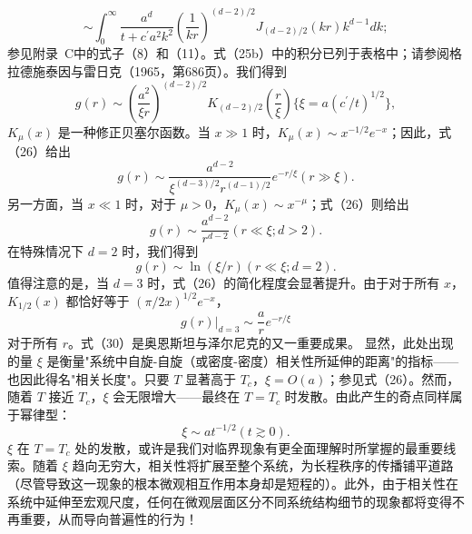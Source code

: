 \begin{equation}\tag{12.11.28}\label{eq:12.11.28}
\sim \int _ { 0 } ^{\infty} \frac { a ^{d} } { t + c ^{\prime} a ^{2} k ^{2} } \left( \frac { 1 } { k r } \right) ^{( d - 2 ) / 2} J _ { ( d - 2 ) / 2 } ( k r ) k ^{d - 1} d k ;
\end{equation}
参见附录~C中的式子（8）和（11）。式（25b）中的积分已列于表格中；请参阅格拉德施泰因与雷日克（1965，第686页）。我们得到
\begin{equation}\tag{12.11.29}\label{eq:12.11.29}
g ( r ) \sim \left( \frac { a ^{2} } { \xi r } \right) ^{( d - 2 ) / 2} K _ { ( d - 2 ) / 2 } \left( \frac { r } { \xi } \right)  \{ \xi = a ( c ^{\prime} / t ) ^{1 / 2} \} ,
\end{equation}
\(K_{\mu}(x)\) 是一种修正贝塞尔函数。当 \(x \gg 1\) 时，\(K_{\mu}(x) \sim x^{-1/2}e^{-x}\)；因此，式（26）给出
\begin{equation}\tag{12.11.30}\label{eq:12.11.30}
g ( r ) \sim \frac { a ^{d - 2} } { \xi ^{( d - 3 ) / 2} r ^{( d - 1 ) / 2} } e ^{- r / \xi}  ( r \gg \xi ) .
\end{equation}
另一方面，当 \(x \ll 1\) 时，对于 \(\mu > 0\)，\(K_{\mu}(x) \sim x^{-\mu}\)；式（26）则给出
\begin{equation}\tag{12.11.31}\label{eq:12.11.31}
g ( r ) \sim \frac { a ^{d - 2} } { r ^{d - 2} }  ( r \ll \xi ; d > 2 ) .
\end{equation}
在特殊情况下 \(d=2\) 时，我们得到
\begin{equation}\tag{12.11.32}\label{eq:12.11.32}
g ( r ) \sim \ln ( \xi / r )  ( r \ll \xi ; d = 2 ) .
\end{equation}
值得注意的是，当 \(d=3\) 时，式（26）的简化程度会显著提升。由于对于所有 \(x\)，\(K_{1/2}(x)\) 都恰好等于 \((\pi/2x)^{1/2}e^{-x}\)，
\begin{equation}\tag{12.11.33}\label{eq:12.11.33}
g ( r ) | _ { d = 3 } \sim \frac { a } { r } e ^{- r / \xi}
\end{equation}
对于所有 \(r\)。式（30）是奥恩斯坦与泽尔尼克的又一重要成果。
显然，此处出现的量 \(\xi\) 是衡量"系统中自旋-自旋（或密度-密度）相关性所延伸的距离"的指标——也因此得名"相关长度"。只要 \(T\) 显著高于 \(T_{c}\)，\(\xi = O(a)\)；参见式（26）。然而，随着 \(T\) 接近 \(T_{c}\)，\(\xi\) 会无限增大——最终在 \(T = T_{c}\) 时发散。由此产生的奇点同样属于幂律型：
\begin{equation}\tag{12.11.34}\label{eq:12.11.34}
\xi \sim a t ^{- 1 / 2}  ( t \gtrsim 0 ) .
\end{equation}
\(\xi\) 在 \(T=T_{c}\) 处的发散，或许是我们对临界现象有更全面理解时所掌握的最重要线索。随着 \(\xi\) 趋向无穷大，相关性将扩展至整个系统，为长程秩序的传播铺平道路（尽管导致这一现象的根本微观相互作用本身却是短程的）。此外，由于相关性在系统中延伸至宏观尺度，任何在微观层面区分不同系统结构细节的现象都将变得不再重要，从而导向普遍性的行为！
